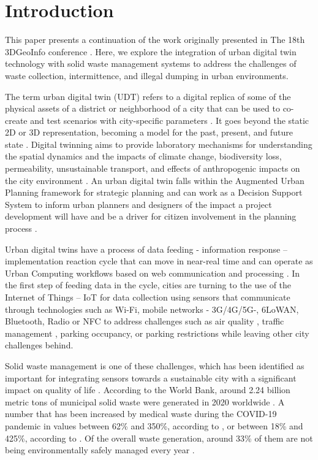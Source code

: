 \documentclass[authoryear,preprint,review,12pt]{elsarticle}
\begin{document}
    \linenumbers

    \section{Introduction}
    \label{sec:Intro}
    This paper presents a continuation of the work originally presented in The 18th 3DGeoInfo conference \citep{cardenasivanSolidWasteVirtualWorld2024}. Here, we explore the integration of urban digital twin technology with solid waste management systems to address the challenges of waste collection, intermittence, and illegal dumping in urban environments.

    The term urban digital twin (UDT) refers to a digital replica of some of the physical assets of a district or neighborhood of a city that can be used to co-create and test scenarios with city-specific parameters \citep{Ruohomaki2018}. It goes beyond the static 2D or 3D representation, becoming a model for the past, present, and future state \citep{geohubDigitalTwinningUrban2022}. Digital twinning aims to provide laboratory mechanisms for understanding the spatial dynamics and the impacts of climate change, biodiversity loss, permeability, unsustainable transport, and effects of anthropogenic impacts on the city environment \citep{caprariDigitalTwinUrban2022}. An urban digital twin falls within the Augmented Urban Planning framework for strategic planning \citep{Azadi2023} and can work as a Decision Support System to inform urban planners and designers of the impact a project development will have and be a driver for citizen involvement in the planning process \citep{Dembski2019, Dembski2020}.

    Urban digital twins have a process of data feeding - information response – implementation reaction cycle that can move in near-real time and can operate as Urban Computing workflows based on web communication and processing \citep{Nourian2018}. In the first step of feeding data in the cycle, cities are turning to the use of the Internet of Things – IoT for data collection \citep{abadiaSystematicSurveyInternet2022} using sensors that communicate through technologies such as Wi-Fi, mobile networks - 3G/4G/5G-, 6LoWAN, Bluetooth, Radio or NFC \citep{Balaji2019} to address challenges such as air quality \citep{Mak2021}, traffic management \citep{Ibrahim2022}, parking occupancy, or parking restrictions \citep{latreCityThingsIntegrated2016} while leaving other city challenges behind.

    Solid waste management is one of these challenges, which has been identified as important for integrating sensors towards a sustainable city with a significant impact on quality of life \citep{Ismagilova2019}. According to the World Bank, around 2.24 billion metric tons of municipal solid waste were generated in 2020 worldwide \citep{Kaza2021}. A number that has been increased by medical waste during the COVID-19 pandemic in values between 62\% and 350\%, according to  \citep{Yousefi2021}, or between 18\% and 425\%, according to \citep{Liang2021}. Of the overall waste generation, around 33\% of them are not being environmentally safely managed every year \citep{Kaza2018}. 
\end{document}

